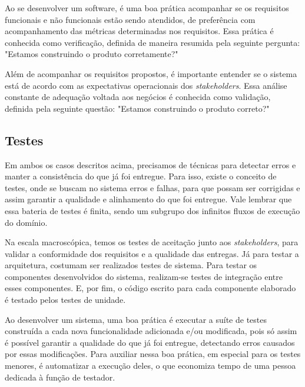 Ao se desenvolver um software, é uma boa prática acompanhar se os requisitos funcionais e não funcionais estão sendo atendidos, de preferência com acompanhamento das métricas determinadas nos requisitos. Essa prática é conhecida como verificação, definida de maneira resumida pela seguinte pergunta\cite[cap. ~10, p. ~6]{ieeecomputersociety2014}: "Estamos construindo o produto corretamente?"

Além de acompanhar os requisitos propostos, é importante entender se o sistema está de acordo com as expectativas operacionais dos \textit{stakeholders}. Essa análise constante de adequação voltada aos negócios é conhecida como validação, definida pela seguinte questão\cite[cap. ~10, p. ~6]{ieeecomputersociety2014}: "Estamos construindo o produto correto?"

\subsection{Testes}
Em ambos os casos descritos acima, precisamos de técnicas para detectar erros e manter a consistência do que já foi entregue. Para isso, existe o conceito de testes, onde se buscam no sistema erros e falhas, para que possam ser corrigidas e assim garantir a qualidade e alinhamento do que foi entregue. Vale lembrar que essa bateria de testes é finita, sendo um subgrupo dos infinitos fluxos de execução do domínio\cite{ieeecomputersociety2014}.

Na escala macroscópica, temos os testes de aceitação junto aos \textit{stakeholders}, para validar a conformidade dos requisitos e a qualidade das entregas. Já para testar a arquitetura, costumam ser realizados testes de sistema. Para testar os componentes desenvolvidos do sistema, realizam-se testes de integração entre esses componentes. E, por fim, o código escrito para cada componente elaborado é testado pelos testes de unidade.

Ao desenvolver um sistema, uma boa prática é executar a suíte de testes construída a cada nova funcionalidade adicionada e/ou modificada, pois só assim é possível garantir a qualidade do que já foi entregue, detectando erros causados por essas modificações. Para auxiliar nessa boa prática, em especial para os testes menores, é automatizar a execução deles, o que economiza tempo de uma pessoa dedicada à função de testador.
